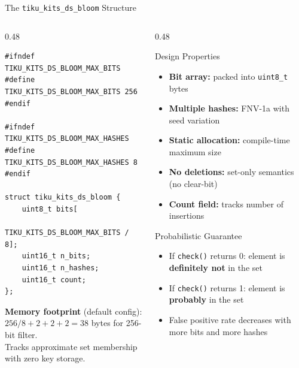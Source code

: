 \documentclass[aspectratio=169, 10pt]{beamer}
\begin{document}
\begin{frame}[fragile]{The \texttt{tiku\_kits\_ds\_bloom} Structure}
\begin{columns}[T]
\begin{column}{0.48\textwidth}
\begin{lstlisting}[style=cstyle,
  title={ds/bloom/tiku\_kits\_ds\_bloom.h}]
#ifndef TIKU_KITS_DS_BLOOM_MAX_BITS
#define TIKU_KITS_DS_BLOOM_MAX_BITS 256
#endif

#ifndef TIKU_KITS_DS_BLOOM_MAX_HASHES
#define TIKU_KITS_DS_BLOOM_MAX_HASHES 8
#endif

struct tiku_kits_ds_bloom {
    uint8_t bits[
        TIKU_KITS_DS_BLOOM_MAX_BITS / 8];
    uint16_t n_bits;
    uint16_t n_hashes;
    uint16_t count;
};
\end{lstlisting}

\vspace{0.3em}
\textbf{Memory footprint} (default config):\\
$256/8 + 2 + 2 + 2 = 38$ bytes for 256-bit filter.\\
Tracks approximate set membership with zero key storage.
\end{column}

\begin{column}{0.48\textwidth}
\begin{block}{Design Properties}
\begin{itemize}
  \item \textbf{Bit array:} packed into \texttt{uint8\_t} bytes
  \item \textbf{Multiple hashes:} FNV-1a with seed variation
  \item \textbf{Static allocation:} compile-time maximum size
  \item \textbf{No deletions:} set-only semantics (no clear-bit)
  \item \textbf{Count field:} tracks number of insertions
\end{itemize}
\end{block}

\vspace{0.3em}
\begin{alertblock}{Probabilistic Guarantee}
\begin{itemize}
  \item If \texttt{check()} returns 0: element is \textbf{definitely not} in the set
  \item If \texttt{check()} returns 1: element is \textbf{probably} in the set
  \item False positive rate decreases with more bits and more hashes
\end{itemize}
\end{alertblock}
\end{column}
\end{columns}
\end{frame}
\end{document}
